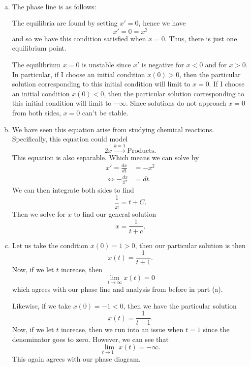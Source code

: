 \documentclass[12pt]{article} %
\begin{document}
\begin{solution}~
\begin{enumerate}[(a)]
        \item The phase line is as follows:

                \begin{centering}
                \end{centering}
        
        The equilibria are found by setting $x'=0$, hence we have
        \[
            x'=0=x^2
        \]
        and so we have this condition satisfied when $x=0$.  Thus, there is just one equilibrium point.  

        The equilibrium $x=0$ is unstable since $x'$ is negative for $x<0$ and for $x>0$.  In particular, if I choose an initial condition $x(0)>0$, then the particular solution corresponding to this initial condition will limit to $x=0$. If I choose an initial condition $x(0)<0$, then the particular solution corresponding to this initial condition will limit to $-\infty$.  Since solutions do not approach $x=0$ from both sides, $x=0$ can't be stable.  

        \item We have seen this equation arise from studying chemical reactions.  Specifically, this equation could model
\[
2x \xrightarrow{k=1} \textrm{Products}.
\]
This equation is also separable.  Which means we can solve by
\begin{align*}
    x'=\frac{dx}{dt}&=-x^2\\
    \iff -\frac{dx}{x^2}&=dt.
\end{align*}
We can then integrate both sides to find
\[
\frac{1}{x}=t+C.
\]
Then we solve for $x$ to find our general solution
\[
\boxed{x=\frac{1}{t+c}.}
\]
\item Let us take the condition $x(0)=1>0$, then our particular solution is then
\[
x(t) = \frac{1}{t+1}.
\]
Now, if we let $t$ increase, then 
\[
\lim_{t \to \infty} x(t) = 0
\]
which agrees with our phase line and analysis from before in part (a).

Likewise, if we take $x(0)=-1<0$, then we have the particular solution
\[
x(t) = \frac{1}{t-1}.
\]
Now, if we let $t$ increase, then we run into an issue when $t=1$ since the denominator goes to zero.  However, we can see that
\[
\lim_{t\to 1^-} x(t) = -\infty.
\]
This again agrees with our phase diagram.


\end{enumerate}
\end{solution}
\end{document}
